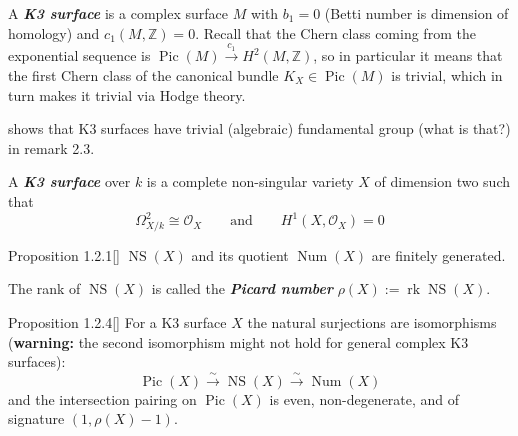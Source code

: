 \begin{defn}[K3 course]\leavevmode
A \textit{\textbf{K3 surface}} is a complex surface \(M\) with \(b_1=0\) (Betti number is dimension of homology) and \(c_1(M,\mathbb{Z})=0\). Recall that the Chern class coming from the exponential sequence is \(\operatorname{Pic}(M) \xrightarrow{c_1}H^{2}(M,\mathbb{Z})\), so in particular it means that the first Chern class of the canonical bundle \(K_X \in \operatorname{Pic}(M)\) is trivial, which in turn makes it trivial via Hodge theory.
\end{defn}

\begin{remark}\leavevmode
\cite{huk} shows that K3 surfaces have trivial (algebraic) fundamental group (what is that?) in remark 2.3.
\end{remark}

\begin{defn}\leavevmode
A \textit{\textbf{K3 surface}} over \(k\) is a complete non-singular variety \(X\) of dimension two such that
 \[\Omega^2_{X/k}\cong \mathcal{O}_X\qquad \text{and} \qquad H^{1}(X,\mathcal{O}_X)=0\]
\end{defn}

\begin{thing4}{Proposition 1.2.1}[\cite{huk}]\leavevmode
\(\operatorname{NS}(X)\) and its quotient  \(\operatorname{Num}(X)\) are finitely generated.

The rank of \(\operatorname{NS}(X)\) is called the \textit{\textbf{Picard number}} \(\rho(X):=\operatorname{rk}\operatorname{NS}(X)\).
\end{thing4}

\begin{thing4}{Proposition 1.2.4}[\cite{huk}]\label{prop:1.2.4}\leavevmode
For a K3 surface \(X\) the natural surjections are isomorphisms (\textbf{warning:} the second isomorphism might not hold for general complex K3 surfaces):
\[\operatorname{Pic}(X) \xrightarrow{\sim}\operatorname{NS}(X)\xrightarrow{\sim}\operatorname{Num}(X)\]
and the intersection pairing on \(\operatorname{Pic}(X)\) is even, non-degenerate, and of signature \((1,\rho(X)-1)\).
\end{thing4}

